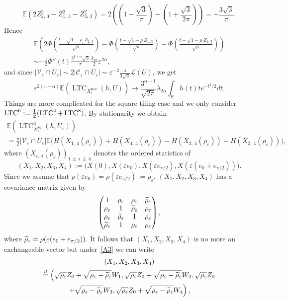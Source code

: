 \documentclass[10pt]{amsart}
\theoremstyle{definition}\newtheorem{defi}[theo]{Definition}\newtheorem{rema}[theo]{Remark}\newtheorem{exam}[theo]{Example}\newtheorem{exem}[theo]{Example}\newtheorem{nota}[theo]{Notation}
\newcommand{\R}{\mathbb{R}}
\newcommand{\E}{\mathbb{E}}
\newcommand{\eps}{\varepsilon}
\DeclareMathOperator{\LTC}{LTC}
\DeclareMathOperator{\Hex}{Hex}
\DeclareMathOperator{\Sq}{Sq}
\newcommand{\calL}{\mathcal{L}}
\newcommand{\calC}{\mathcal{C}}
\newcommand{\calV}{\mathcal{V}}
\let\oldtilde\tilde
\renewcommand*{\tilde}[1]{\mathchoice{\widetilde{#1}}{\widetilde{#1}}{\oldtilde{#1}}{\oldtilde{#1}}}
\begin{document}
\[
\E\left(2Z_{2,\,3}^2-Z_{1,\,3}^2-Z_{3,\,3}^2\right)=2\left(\left(1-\frac{\sqrt{3}}{\pi}\right)-\left(1+\frac{\sqrt{3}}{2\pi}\right)\right)=-\frac{3\sqrt{3}}{\pi}.
\]
Hence
\begin{multline*}
\E\left(2\Phi\left(\frac{t-\sqrt{1-\rho_\eps}Z_{2,\,3}}{\sqrt{\rho}}\right)-\Phi\left(\frac{t-\sqrt{1-\rho}Z_{1,\,3}}{\sqrt{\rho}}\right)-\Phi\left(\frac{t-\sqrt{1-\rho}Z_{1,\,3}}{\sqrt{\rho}}\right)\right)
\\
\sim -\frac{1}{2}\Phi''(t)\frac{3^{1+\alpha}\sqrt{3}}{\pi}\frac{\lambda_{{2\alpha}}}{2}\eps^{2\alpha},
\end{multline*}
and since $|\calV_\eps\cap U_\eps|\sim 2 |\calC_\eps\cap U_\eps|\sim \eps^{-2}\frac{4}{3\sqrt{3}}{\calL}(U)$, we get
\[
\eps^{2(1-\alpha)}\E\left(\LTC_{X_\eps^{\Hex}}(h,U)\right)\longrightarrow \frac{3^{\alpha-1}}{\sqrt{2\pi}}\lambda_{{2\alpha}}\int_{\R}h(t)te^{-t^2/2}dt.
\]
Things are more complicated for the square tiling case and we only consider $\LTC^6\linebreak :=\frac{1}{2}(\LTC^4+\LTC^8)$. By stationarity we obtain
\begin{multline*}
\E\left(\LTC^6_{X_\eps^{\Sq}}(h,U_\eps)\right)\\
=\frac{\pi}{2}\left|\calV_\eps\cap U_\eps\right|
\E\big(H\left(X_{1,\,4}(\rho_\eps)\right)+H\left(X_{4,\,4}(\rho_\eps)\right)-H\left(X_{2,\,4}(\rho_\eps)\right)-H\left(X_{3,\,4}(\rho_\eps)\right)\big),
\end{multline*}
where $(X_{i,\,4}(\rho_\eps))_{1\,\le\,i\,\le\,4}$ denotes the ordered statistics of
\[
\left(X_1,X_2,X_3,X_4\right):=\big(X(0),X(\eps e_0),X(\eps e_{\pi/2}),X(\eps (e_0+e_{\pi/2}))\big).
\]
Since we assume that $\rho(\eps e_0)=\rho(\eps e_{\pi/2}):=\rho_\eps$, $(X_1,X_2,X_3,X_4)$ has a covariance matrix given by
\[
\begin{pmatrix}
1&\rho_\eps& \rho_\eps& \tilde{\rho}_\eps\\
\rho_\eps&1& \tilde{\rho}_\eps& \rho_\eps\\
\rho_\eps&\tilde{\rho}_\eps& 1&\rho_\eps\\
\tilde{\rho}_\eps& 1&\rho_\eps&\rho_\eps
\end{pmatrix},
\]
where $\tilde{\rho}_\eps=\rho(\eps (e_0+e_{\pi/2}))$. It follows that $(X_1,X_2,X_3,X_4)$ is no more an exchangeable vector but under~\eqref{A3} we can write
\begin{multline*}
\left(X_1,X_2,X_3,X_4\right)
\\
\stackrel{d}{=}\left(\sqrt{\rho_\eps}Z_0 +\sqrt{\rho_\eps-\tilde{\rho}_\eps}W_1,\sqrt{\rho_\eps}Z_0+\sqrt{\rho_\eps-\tilde{\rho}_\eps}W_2,\sqrt{\rho_\eps}Z_0\right.\\
\left. +\sqrt{\rho_\eps-\tilde{\rho}_\eps}W_3,\sqrt{\rho_\eps}Z_0+\sqrt{\rho_\eps-\tilde{\rho}_\eps}W_4\right),
\end{multline*}
\end{document}
